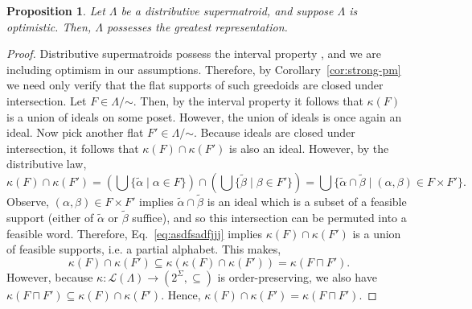 \documentclass[11pt]{article}
\newtheorem{proposition}[theorem]{Proposition}
\newcommand{\univ}{\Sigma}
\newcommand{\glang}{\Lambda}
\providecommand{\L}{}
\renewcommand{\L}{\mathscr{L}}
\begin{document}
\begin{proposition}
    Let $\glang$ be a distributive supermatroid, and suppose $\glang$ is optimistic.
    Then, $\glang$ possesses the greatest representation.
\end{proposition}
\begin{proof}
    Distributive supermatroids possess the interval property \cite{korte2012greedoids}, and we are including optimism in our assumptions.
    Therefore, by Corollary~\ref{cor:strong-pm} we need only verify that the flat supports of such greedoids are closed under intersection.
    Let $F\in\glang/\mathord{\sim}$.
    Then, by the interval property it follows that $\kappa(F)$ is a union of ideals on some poset.
    However, the union of ideals is once again an ideal.
    Now pick another flat $F'\in\glang/\mathord{\sim}$.
    Because ideals are closed under intersection, it follows that $\kappa(F)\cap\kappa(F')$ is also an ideal.
    However, by the distributive law,
    \begin{equation}\label{eq:asdfsadfjjj}
        \kappa(F)\cap\kappa(F') = \left(\bigcup\{\widetilde{\alpha} \mid \alpha \in F\}\right) \cap \left(\bigcup\{\widetilde{\beta}\mid \beta \in F'\}\right) = \bigcup\{\widetilde{\alpha}\cap\widetilde{\beta}\mid (\alpha,\beta)\in F\times F'\}.
    \end{equation}
    Observe, $(\alpha,\beta)\in F\times F'$ implies $\widetilde{\alpha}\cap\widetilde{\beta}$ is an ideal which is a subset of a feasible support (either of $\widetilde{\alpha}$ or $\widetilde{\beta}$ suffice), and so this intersection can be permuted into a feasible word.
    Therefore, Eq.~\ref{eq:asdfsadfjjj} implies $\kappa(F)\cap\kappa(F')$ is a union of feasible supports, i.e. a partial alphabet.
    This makes,
    \[
        \kappa(F)\cap\kappa(F') \subseteq \kappa(\kappa(F)\cap\kappa(F')) = \kappa(F\sqcap F'). 
    \]
    However, because $\kappa:\L(\glang)\to(2^\univ,\subseteq)$ is order-preserving, we also have $\kappa(F \sqcap F') \subseteq \kappa(F)\cap\kappa(F')$.
    Hence, $\kappa(F)\cap\kappa(F') = \kappa(F\sqcap F')$.
\end{proof}

\iffalse
\end{document}
